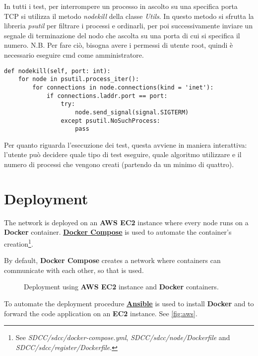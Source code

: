 \documentclass[conference]{IEEEtran}
\begin{document}
In tutti i test, per interrompere un processo in ascolto su una specifica porta TCP si utilizza il metodo \textit{nodekill} della classe \textit{Utils}.
In questo metodo si sfrutta la libreria \textit{psutil} per filtrare i processi e ordinarli, per poi successivamente inviare un segnale di terminazione del nodo che ascolta su una porta di cui si specifica il numero.
N.B. Per fare ciò, bisogna avere i permessi di utente root, quindi è necessario eseguire cmd come amministratore.

\begin{lstlisting}
def nodekill(self, port: int):
    for node in psutil.process_iter():
        for connections in node.connections(kind = 'inet'):
            if connections.laddr.port == port:
                try:
                    node.send_signal(signal.SIGTERM)
                except psutil.NoSuchProcess:
                    pass
\end{lstlisting}

Per quanto riguarda l'esecuzione dei test, questa avviene in maniera interattiva: l'utente può decidere quale tipo di test eseguire, quale algoritmo utilizzare e il numero di processi che vengono creati (partendo da un minimo di quattro).

\section{Deployment}

The network is deployed on an \textbf{AWS EC2} instance where every node runs on a \textbf{Docker} container. 
\href{https://docs.docker.com/compose/}{\textbf{Docker Compose}} is used to automate the container's creation\footnote{See \textit{SDCC/sdcc/docker-compose.yml},  \textit{SDCC/sdcc/node/Dockerfile} and \textit{SDCC/sdcc/register/Dockerfile}.}. 

By default, \textbf{Docker Compose} creates a network where containers can communicate with each other, so that is used. 

\begin{figure}[htbp]\label{fig:arch}
  \centering
  
  \caption{Deployment using \textbf{AWS EC2} instance and \textbf{Docker} containers.}
\end{figure}

To automate the deployment procedure \href{https://www.ansible.com/}{\textbf{Ansible}} is used to install \textbf{Docker} and to forward the code application on an \textbf{EC2} instance. See \ref{fig:aws}.
\end{document}
